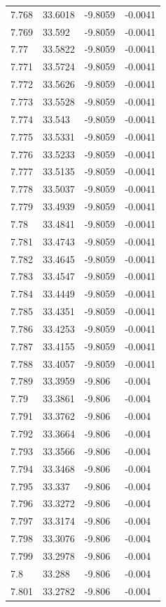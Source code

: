 \begin{tabular}{llll}
7.768 & 33.6018 & -9.8059 & -0.0041 \\
7.769 & 33.592 & -9.8059 & -0.0041 \\
7.77 & 33.5822 & -9.8059 & -0.0041 \\
7.771 & 33.5724 & -9.8059 & -0.0041 \\
7.772 & 33.5626 & -9.8059 & -0.0041 \\
7.773 & 33.5528 & -9.8059 & -0.0041 \\
7.774 & 33.543 & -9.8059 & -0.0041 \\
7.775 & 33.5331 & -9.8059 & -0.0041 \\
7.776 & 33.5233 & -9.8059 & -0.0041 \\
7.777 & 33.5135 & -9.8059 & -0.0041 \\
7.778 & 33.5037 & -9.8059 & -0.0041 \\
7.779 & 33.4939 & -9.8059 & -0.0041 \\
7.78 & 33.4841 & -9.8059 & -0.0041 \\
7.781 & 33.4743 & -9.8059 & -0.0041 \\
7.782 & 33.4645 & -9.8059 & -0.0041 \\
7.783 & 33.4547 & -9.8059 & -0.0041 \\
7.784 & 33.4449 & -9.8059 & -0.0041 \\
7.785 & 33.4351 & -9.8059 & -0.0041 \\
7.786 & 33.4253 & -9.8059 & -0.0041 \\
7.787 & 33.4155 & -9.8059 & -0.0041 \\
7.788 & 33.4057 & -9.8059 & -0.0041 \\
7.789 & 33.3959 & -9.806 & -0.004 \\
7.79 & 33.3861 & -9.806 & -0.004 \\
7.791 & 33.3762 & -9.806 & -0.004 \\
7.792 & 33.3664 & -9.806 & -0.004 \\
7.793 & 33.3566 & -9.806 & -0.004 \\
7.794 & 33.3468 & -9.806 & -0.004 \\
7.795 & 33.337 & -9.806 & -0.004 \\
7.796 & 33.3272 & -9.806 & -0.004 \\
7.797 & 33.3174 & -9.806 & -0.004 \\
7.798 & 33.3076 & -9.806 & -0.004 \\
7.799 & 33.2978 & -9.806 & -0.004 \\
7.8 & 33.288 & -9.806 & -0.004 \\
7.801 & 33.2782 & -9.806 & -0.004 \\

\end{tabular}
